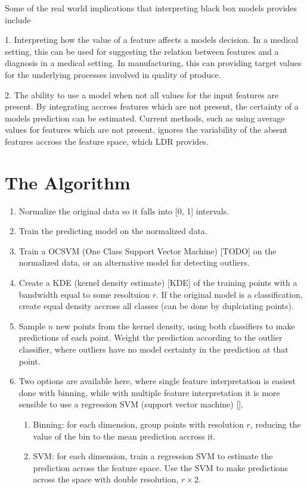 \documentclass[a4paperpaper,twocolumn]{article}
\begin{document}
Some of the real world implications that interpreting black box models provides include

1. Interpreting how the value of a feature affects a models decision. In a medical setting, this can be used for suggesting the relation between features and a diagnosis in a medical setting. In manufacturing, this can providing target values for the underlying processes involved in quality of produce. 

2. The ability to use a model when not all values for the input features are present. By integrating accross features which are not present, the certainty of a models prediction can be estimated. Current methods, such as using average values for features which are not present, ignores the variability of the absent features accross the feature space, which LDR provides.

\section{The Algorithm}

\begin{enumerate}
\item Normalize the original data so it falls into [0, 1] intervals.
\item Train the predicting model on the normalized data.
\item Train a OCSVM (One Class Support Vector Machine) [TODO] on the normalized data, or an alternative model for detecting outliers.
\item Create a KDE (kernel density estimate) [KDE] of the training points with a bandwidth equal to some resoltuion $r$. If the original model is a classification, create equal density accross all classes (can be done by duplciating points).
\item Sample $n$ new points from the kernel density, using both classifiers to make predictions of each point. Weight the prediction according to the outlier classifier, where outliers have no model certainty in the prediction at that point.
\item Two options are available here, where single feature interpretation is easiest done with binning, while with multiple feature interpretation it is more sensible to use a regression SVM (support vector machine) [].
    \begin{enumerate}
        \item Binning: for each dimension, group points with resolution $r$, reducing the value of the bin to the mean prediction accross it.
        \item SVM: for each dimension, train a regression SVM to estimate the prediction across the feature space. Use the SVM to make predictions across the space with double resolution, $r \times 2$.
    \end{enumerate}
\end{enumerate}
\end{document}
